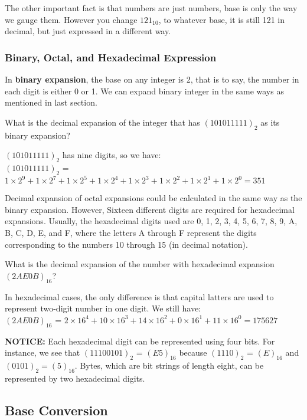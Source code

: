     The other important fact is that numbers are just numbers, base is only the way we gauge them.
    However you change $121_{10}$, to whatever base, it is still 121 in decimal, but just expressed 
    in a different way.
    \subsubsection*{Binary, Octal, and Hexadecimal Expression}
    In \textbf{binary expansion}, the base on any integer is 2, that is to say, the number in each digit is either 0 or 1.
We can expand binary integer in the same ways as mentioned in last section.

\begin{example}
	What is the decimal expansion of the integer that has $(101011111)_2$ as its binary expansion?

		$(101011111)_2$ has nine digits, so we have:\\
		$(101011111)_2$ = $1\times 2^9 + 1\times 2^7+1\times 2^5+1\times 2^4+1\times 2^3+1\times 2^2+1\times 2^1+1\times 2^0 = 351$

\end{example}
Decimal expansion of octal expansions could be calculated in the same way as the binary expansion. However, 
Sixteen different digits are required for hexadecimal expansions. Usually, the hexadecimal digits used are 
0, 1, 2, 3, 4, 5, 6, 7, 8, 9, A, B, C, D, E, and F, where the letters A through F represent the digits 
corresponding to the numbers 10 through 15 (in decimal notation). 
\begin{example}
	What is the decimal expansion of the number with hexadecimal expansion $(2AE0B)_{16}$?
\end{example}
In hexadecimal cases, the only difference is that capital latters are used to represent two-digit number in
		one digit. We still have:\\
		$(2AE0B)_{16}$ = $2\times 16^4 + 10\times 16^3 + 14\times 16^2 + 0 \times 16^1 + 11 \times 16^0=175627$

        \textbf{NOTICE: } Each hexadecimal digit can be represented using four bits. For instance, 
we see that $(1110 0101)_2$ = $(E5)_{16}$ because $(1110)_2$ = $(E)_{16}$ and $(0101)_2 = (5)_{16}$. Bytes, which are bit strings 
of length eight, can be represented by two hexadecimal digits.

    \subsection{Base Conversion}
